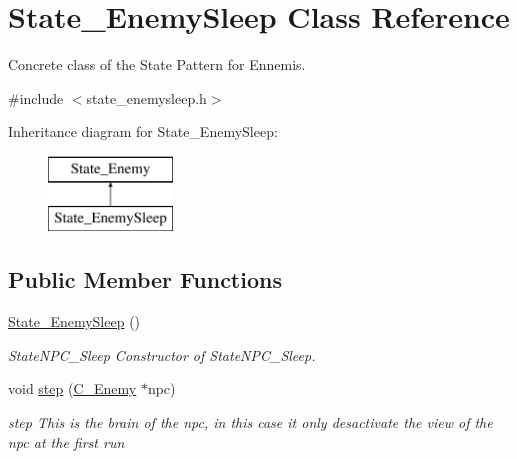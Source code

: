 \hypertarget{class_state___enemy_sleep}{}\section{State\+\_\+\+Enemy\+Sleep Class Reference}
\label{class_state___enemy_sleep}


Concrete class of the State Pattern for Ennemis.  




{\ttfamily \#include $<$state\+\_\+enemysleep.\+h$>$}

Inheritance diagram for State\+\_\+\+Enemy\+Sleep\+:\begin{figure}[H]
\begin{center}
\leavevmode
\includegraphics[height=2.000000cm]{class_state___enemy_sleep}
\end{center}
\end{figure}
\subsection*{Public Member Functions}
\begin{DoxyCompactItemize}
\item 
\hypertarget{class_state___enemy_sleep_a755491551ed704281d6274f3b34a9cb2}{}\hyperlink{class_state___enemy_sleep_a755491551ed704281d6274f3b34a9cb2}{State\+\_\+\+Enemy\+Sleep} ()\label{class_state___enemy_sleep_a755491551ed704281d6274f3b34a9cb2}

\begin{DoxyCompactList}\small\item\em State\+N\+P\+C\+\_\+\+Sleep Constructor of State\+N\+P\+C\+\_\+\+Sleep. \end{DoxyCompactList}\item 
void \hyperlink{class_state___enemy_sleep_a134ca6bac69362eb3ae7884415e7b8f3}{step} (\hyperlink{class_c___enemy}{C\+\_\+\+Enemy} $\ast$npc)
\begin{DoxyCompactList}\small\item\em step This is the brain of the npc, in this case it only desactivate the view of the npc at the first run \end{DoxyCompactList}\end{DoxyCompactItemize}


